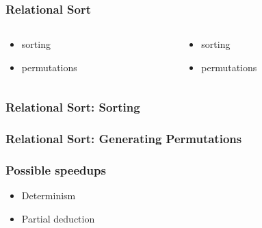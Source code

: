 \documentclass[xcolor=table, aspectratio=169]{beamer}
\newcommand{\happyCheck}{\color{green}{\checkmark}}
\newcommand{\timeout}{\color{red}{\clock}}
\begin{document}
\begin{frame}[fragile]
  \frametitle{Relational Sort}
\begin{columns}
  \begin{column}[t]{0.49\textwidth}
    

    \vfill

    \begin{center}
      \begin{minipage}{0.4\textwidth}
        \begin{itemize}
          \item[\happyCheck] sorting
          \item[\timeout] permutations
        \end{itemize}
      \end{minipage}
    \end{center}

  \end{column}
  \begin{column}[t]{0.49\textwidth}
    

    \vfill

    \begin{center}
      \begin{minipage}{0.4\textwidth}
        \begin{itemize}
          \item[\timeout] sorting
          \item[\happyCheck] permutations
        \end{itemize}
      \end{minipage}
    \end{center}


  \end{column}
\end{columns}
\end{frame}

\begin{frame}[fragile]
  \frametitle{Relational Sort: Sorting}
    
\end{frame}


\begin{frame}[fragile]
  \frametitle{Relational Sort: Generating Permutations}
    
\end{frame}

\begin{frame}[fragile]
    \frametitle{Possible speedups}

    \begin{center}
        \begin{minipage}{0.4\textwidth}
            \begin{itemize}
                \item Determinism
                \item Partial deduction
            \end{itemize}
        \end{minipage}
    \end{center}
\end{frame}
\end{document}

